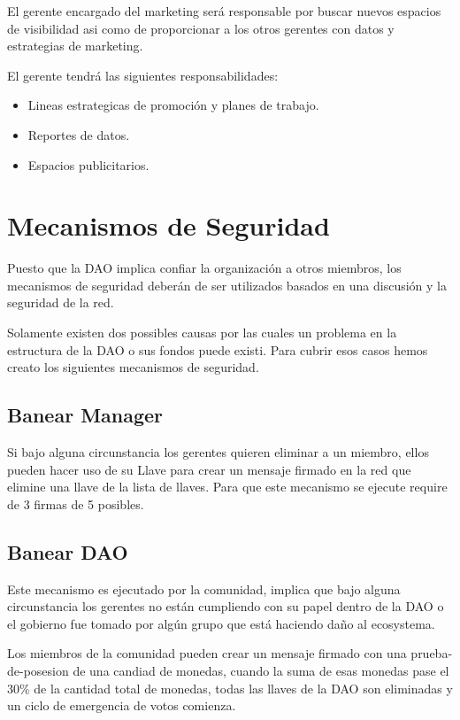 \documentclass{article}
\begin{document}
El gerente encargado del marketing será responsable por buscar nuevos espacios de visibilidad asi como de proporcionar a los otros gerentes con datos y estrategias de marketing.

El gerente tendrá las siguientes responsabilidades:

\begin{itemize}
  \item Lineas estrategicas de promoción y planes de trabajo.
  \item Reportes de datos.
  \item Espacios publicitarios.
\end{itemize}

\section{Mecanismos de Seguridad}

Puesto que la DAO implica confiar la organización a otros miembros, los mecanismos de seguridad deberán de ser utilizados basados en una discusión y la seguridad de la red.

Solamente existen dos possibles causas por las cuales un problema en la estructura de la DAO o sus fondos puede existi. Para cubrir esos casos hemos creato los siguientes mecanismos de seguridad.

\subsection{Banear Manager}

Si bajo alguna circunstancia los gerentes quieren eliminar a un miembro, ellos pueden hacer uso de su Llave para crear un mensaje firmado en la red que elimine una llave de la lista de llaves. Para que este mecanismo se ejecute require de 3 firmas de 5 posibles.

\subsection{Banear DAO}

Este mecanismo es ejecutado por la comunidad, implica que bajo alguna circunstancia los gerentes no están cumpliendo con su papel dentro de la DAO o el gobierno fue tomado por algún grupo que está haciendo daño al ecosystema.

Los miembros de la comunidad pueden crear un mensaje firmado con una prueba-de-posesion de una candiad de monedas, cuando la suma de esas monedas pase el 30\% de la cantidad total de monedas, todas las llaves de la DAO son eliminadas y un ciclo de emergencia de votos comienza.
\end{document}
